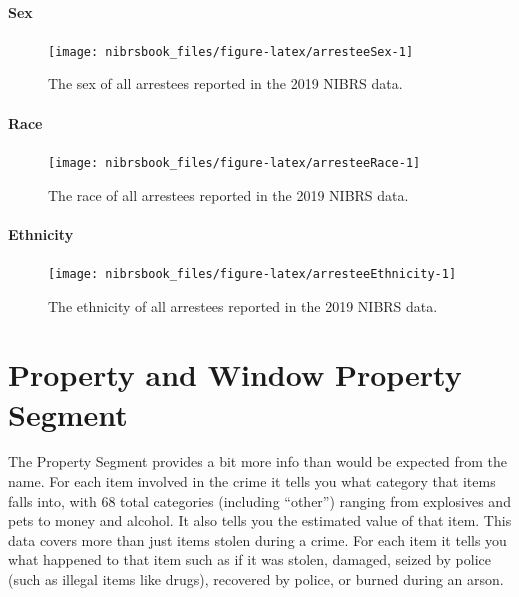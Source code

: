 \documentclass[
  12pt,
  openany]{book}
\begin{document}
\hypertarget{sex-2}{%
\subsubsection{Sex}\label{sex-2}}

\begin{figure}

{\centering \texttt{[image: nibrsbook\_files/figure-latex/arresteeSex-1]} 

}

\caption{The sex of all arrestees reported in the 2019 NIBRS data.}\label{fig:arresteeSex}
\end{figure}

\hypertarget{race-2}{%
\subsubsection{Race}\label{race-2}}

\begin{figure}

{\centering \texttt{[image: nibrsbook\_files/figure-latex/arresteeRace-1]} 

}

\caption{The race of all arrestees reported in the 2019 NIBRS data.}\label{fig:arresteeRace}
\end{figure}

\hypertarget{ethnicity-1}{%
\subsubsection{Ethnicity}\label{ethnicity-1}}

\begin{figure}

{\centering \texttt{[image: nibrsbook\_files/figure-latex/arresteeEthnicity-1]} 

}

\caption{The ethnicity of all arrestees reported in the 2019 NIBRS data.}\label{fig:arresteeEthnicity}
\end{figure}

\hypertarget{property-and-window-property-segment}{%
\chapter{Property and Window Property Segment}\label{property-and-window-property-segment}}

The Property Segment provides a bit more info than would be expected from the name. For each item involved in the crime it tells you what category that items falls into, with 68 total categories (including ``other'') ranging from explosives and pets to money and alcohol. It also tells you the estimated value of that item. This data covers more than just items stolen during a crime. For each item it tells you what happened to that item such as if it was stolen, damaged, seized by police (such as illegal items like drugs), recovered by police, or burned during an arson.
\end{document}
